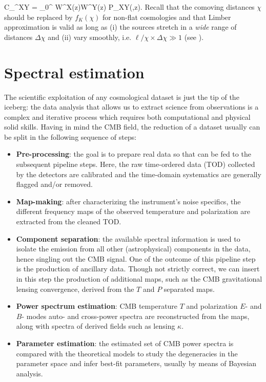 \be
\label{eq:cllimber_z}
C_{\ell}^{XY} = \int_0^{\infty}  W^X(z)W^Y(z) P_{XY}\Biggl(,z\Biggr). 
\ee
Recall that the comoving distances $\chi$ should be replaced by $f_K(\chi)$ for non-flat cosmologies and that Limber approximation is valid as long as (i) the sources stretch in a \emph{wide} range of distances $\Delta\chi$ and (ii) vary smoothly, i.e. $\ell/\chi\times\Delta\chi \gg 1$ (see \citet{Simon2007,Bernardeau2011}).

\section{Spectral estimation}
\label{sec:ps_est}
The scientific exploitation of any cosmological dataset is just the tip of the iceberg: the data analysis that allows us to extract science from observations is a complex and iterative process which requires both computational and physical solid skills. Having in mind the \gls{CMB} field, the reduction of a dataset usually can be split in the following sequence of steps:
\begin{itemize}
\item{\textbf{Pre-processing}: the goal is to prepare real data so that can be fed to the subsequent pipeline steps. Here, the raw time-ordered data (TOD) collected by the detectors are calibrated and the time-domain systematics are generally flagged and/or removed.}
\item{\textbf{Map-making}: after characterizing the instrument's noise specifics, the different frequency maps of the observed temperature and polarization are extracted from the cleaned TOD.}
\item{\textbf{Component separation}: the available spectral information is used to isolate the emission from all other (astrophysical) components in the data, hence singling out the \gls{CMB} signal. One of the outcome of this pipeline step is the production of ancillary data. Though not strictly correct, we can insert in this step the production of additional maps, such as the \gls{CMB} gravitational lensing convergence, derived from the $T$ and $P$ separated maps.}
\item{\textbf{Power spectrum estimation}: \gls{CMB} temperature $T$ and polarization $E$- and $B$- modes auto- and cross-power spectra are reconstructed from the maps, along with spectra of derived fields such as lensing $\kappa$.}
\item{\textbf{Parameter estimation}: the estimated set of \gls{CMB} power spectra is compared with the theoretical models to study the degeneracies in the parameter space and infer best-fit parameters, usually by means of Bayesian analysis.}
\end{itemize}


